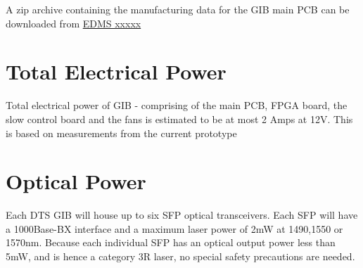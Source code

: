 \documentclass[fleqn,12pt,a4paper]{olplainarticle}
\begin{document}
A zip archive containing the manufacturing data for the GIB main PCB can be downloaded from \href{URL YYY}{EDMS xxxxx}

\section{Total Electrical Power}

Total electrical power of GIB - comprising of the main PCB, FPGA board, the slow control board and the fans is estimated to be at most 2 Amps at 12V. This is based on measurements from the current prototype 

\section{Optical Power}

Each DTS GIB will house up to six SFP optical transceivers. Each SFP will have a 1000Base-BX interface and a maximum laser power of 2mW at 1490,1550 or 1570nm. Because each individual SFP has an optical output power less than 5mW, and is hence a category 3R laser, no special safety precautions are needed.





\end{document}
